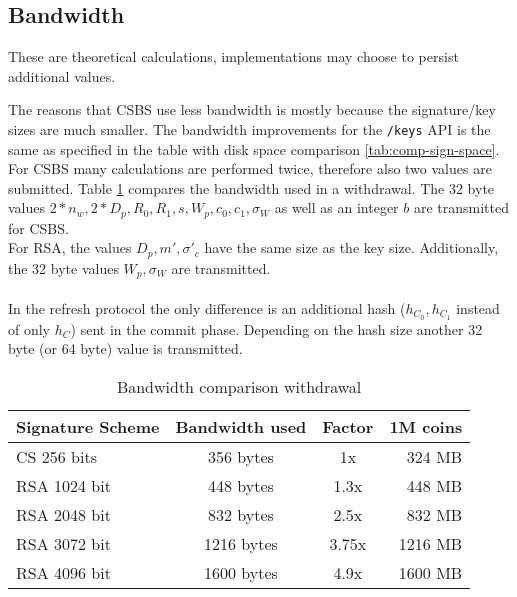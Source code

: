 \subsection{Bandwidth}
\begin{bfhWarnBox}
    These are theoretical calculations, implementations may choose to persist additional values.
\end{bfhWarnBox}
The reasons that \gls{CSBS} use less bandwidth is mostly because the signature/key sizes are much smaller.
The bandwidth improvements for the \texttt{/keys} API is the same as specified in the table with disk space comparison \ref{tab:comp-sign-space}.
For \gls{CSBS} many calculations are performed twice, therefore also two values are submitted.
Table \ref{tab:comp-band-withd} compares the bandwidth used in a withdrawal.
The 32 byte values $2 * n_w, 2 * D_p, R_0, R_1, s,W_p, c_0, c_1, \sigma_W$ as well as an integer $b$ are transmitted for \gls{CSBS}.\\
For RSA, the values $D_p, m', \sigma'_c$ have the same size as the key size.
Additionally, the 32 byte values $W_p, \sigma_W$ are transmitted.
\\\\
In the refresh protocol the only difference is an additional hash ($h_{C_0}, h_{C_1}$ instead of only $h_C$) sent in the commit phase.
Depending on the hash size another 32 byte (or 64 byte) value is transmitted.

\begin{table}[ht]
    \centering
    \setupBfhTabular
    \begin{tabular}{lccr}
        \rowcolor{BFH-tablehead}
        \textbf{Signature Scheme} & \textbf{Bandwidth used} & \textbf{Factor} & \textbf{1M coins}\\\hline
        CS 256 bits & 356 bytes & 1x & 324 MB\\\hline
        RSA 1024 bit & 448 bytes & 1.3x & 448 MB \\\hline
        RSA 2048 bit & 832 bytes & 2.5x & 832 MB\\\hline
        RSA 3072 bit & 1216 bytes & 3.75x & 1216 MB\\\hline
        RSA 4096 bit & 1600 bytes & 4.9x & 1600 MB\\\hline
    \end{tabular}
    \caption{Bandwidth comparison withdrawal}
    \label{tab:comp-band-withd}
\end{table}

